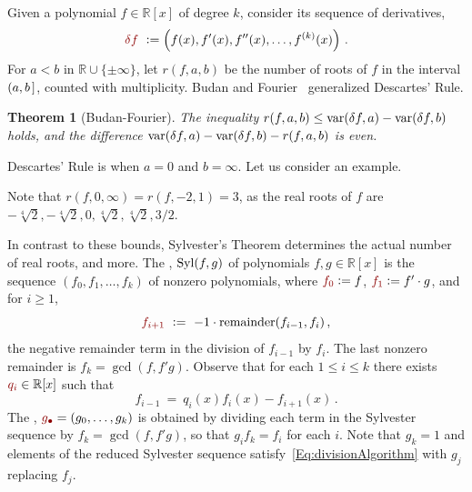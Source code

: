 \documentclass[12pt]{amsart}
\newtheorem{theorem}{Theorem}
\theoremstyle{definition}
\newcommand{\RR}{\mathbb{R}}
\DeclareMathOperator{\var}{{\rm var}}
\DeclareMathOperator{\Syl}{{\rm Syl}}
\newcommand{\defcolor}[1]{{\color{TAMU}#1}}
\newcommand{\demph}[1]{\defcolor{{\sl #1}}}
\begin{document}
Given a polynomial $f\in\RR[x]$ of degree $k$, consider its sequence of derivatives,
%
 \[
   \defcolor{\delta f}\ \vcentcolon= \left(f(x),f'(x),f''(x),\dots,f^{(k)}(x)\right)\,.
 \]
%
For $a<b$ in $\RR\cup\{\pm \infty\}$, let \defcolor{$r(f,a,b)$} be the number of roots of $f$ in the interval $(a,b\hspace{.05cm}]$, counted
with multiplicity.
Budan and Fourier~\cite[Ch.\ 2]{So_Book} generalized Descartes' Rule.

\begin{theorem}[Budan-Fourier]
  The inequality $r(f,a,b)\leq \var(\delta f,a) -\var(\delta f,b)$ holds, and the difference
  $\var(\delta f,a) -\var(\delta f,b)-r(f,a,b)$ is even. 
\end{theorem}

Descartes' Rule is when $a=0$ and $b=\infty$.
Let us consider an example.
%
\begin{leftbar}

\end{leftbar}
%
\noindent Note that $r(f,0,\infty)=r(f,-2,1)=3$, as the real roots of $f$ are $-\sqrt[4]{2},-\sqrt[4]{2},0,\sqrt[4]{2},\sqrt[4]{2},3/2$.

In contrast to these bounds, 
Sylvester's Theorem determines the actual number of real roots, and more.
The \demph{Sylvester sequence}, \defcolor{$\Syl(f,g)$} of polynomials $f,g\in\RR[x]$ is the sequence
$\left(f_0,f_1,\dotsc,f_k\right)$ of nonzero polynomials, where $\defcolor{f_0}\vcentcolon= f$, $\defcolor{f_1}\vcentcolon= f'\cdot g$,
and for $i\geq 1$, 
%
  \[
    \defcolor{f_{i+1}}\ \vcentcolon=\ -1\cdot \mbox{remainder}(f_{i-1},f_i)\,,
  \]
%
the negative remainder term in the division of $f_{i-1}$ by $f_i$.
The last nonzero remainder is $f_k = \gcd(f,f'g)$.
Observe that for each $1\leq i\leq k$ there exists $\defcolor{q_i}\in\RR[x]$ such that
%
 \begin{equation}\label{Eq:divisionAlgorithm}
    f_{i-1}\ =\ q_i(x)f_i(x)-f_{i+1}(x)\,.
 \end{equation}
%
The \demph{reduced Sylvester sequence}, $\defcolor{g_\bullet}=(g_0,\dotsc,g_k)$ is obtained by dividing each term in the Sylvester sequence
by $f_k=\gcd(f,f'g)$, so that $g_if_k=f_i$ for each $i$. 
Note that  $g_k=1$ and elements of the reduced Sylvester sequence satisfy~\eqref{Eq:divisionAlgorithm} with $g_j$ replacing $f_j$.
\end{document}
